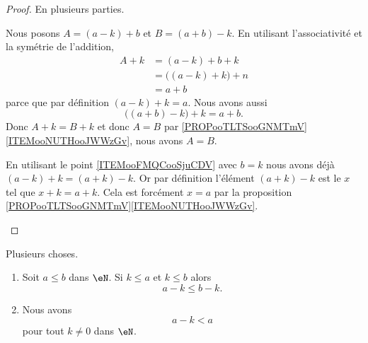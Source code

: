 \begin{proof}
	En plusieurs parties.
	\begin{subproof}

		Nous posons \( A=(a-k)+b\) et \( B=(a+b)-k\). En utilisant l'associativité et la symétrie de l'addition,
		\begin{subequations}
			\begin{align}
				A+k & =(a-k)+b+k             \\
				    & =\big( (a-k)+k \big)+n \\
				    & =a+b
			\end{align}
		\end{subequations}
		parce que par définition \( (a-k)+k=a\). Nous avons aussi
		\begin{equation}
			\big( (a+b)-k \big)+k=a+b.
		\end{equation}
		Donc \( A+k=B+k\) et donc \( A=B\) par \ref{PROPooTLTSooGNMTmV}\ref{ITEMooNUTHooJWWzGv}, nous avons \( A=B\).

		En utilisant le point \ref{ITEMooFMQCooSjuCDV} avec \( b=k\) nous avons déjà \( (a-k)+k=(a+k)-k \). Or par définition l'élément \( (a+k)-k\) est le \( x\) tel que \( x+k=a+k\). Cela est forcément \( x=a\) par la proposition \ref{PROPooTLTSooGNMTmV}\ref{ITEMooNUTHooJWWzGv}.
	\end{subproof}
\end{proof}

\begin{proposition}	\label{PROPooJSZHooVDzBDE}
	Plusieurs choses.
	\begin{enumerate}
		\item		\label{ITEMooVSLRooGhGFgX}
		      Soit \( a\leq b\) dans \( \eN\). Si \( k\leq a\) et \( k\leq b\) alors
		      \begin{equation}
			      a-k\leq b-k.
		      \end{equation}
		\item		\label{ITEMooYGOAooWRbKdj}
		      Nous avons
		      \begin{equation}
			      a-k<a
		      \end{equation}
		      pour tout \( k\neq 0\) dans \( \eN\).
	\end{enumerate}
\end{proposition}

